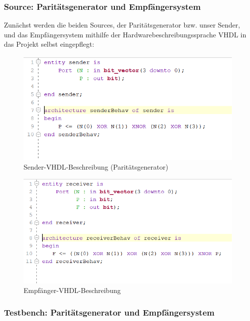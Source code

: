 \documentclass{article}
\begin{document}
\subsubsection{Source: Paritätsgenerator und Empfängersystem}

Zunächst werden die beiden Sources, der Paritätsgenerator bzw. unser Sender, und das Empfängersystem mithilfe der Hardwarebeschreibungssprache VHDL in das Projekt selbst eingepflegt:

\begin{figure}[h]
  \centering
  \includegraphics[width=\textwidth]{../assets/images/DI1/sendervhd.PNG}
  \caption{Sender-VHDL-Beschreibung (Paritätsgenerator)}
  \label{fig:vhd1}
\end{figure}

\begin{figure}[h]
  \centering
  \includegraphics[width=\textwidth]{../assets/images/DI1/receivervhd.PNG}
  \caption{Empfänger-VHDL-Beschreibung}
  \label{fig:vhd2}
\end{figure}
\newpage

\subsubsection{Testbench: Paritätsgenerator und Empfängersystem}
\end{document}
